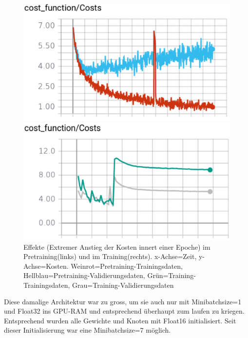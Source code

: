 \begin{figure}
	\centering
	\begin{minipage}[b]{0.48\textwidth}	
		\includegraphics[width=\textwidth]{Kapitel/40Architektur/Bilder/OverflowInPretraining.pdf}
	\end{minipage}
	\hfill
	\begin{minipage}[b]{0.48\textwidth}		
		\includegraphics[width=\textwidth]{Kapitel/40Architektur/Bilder/OverflowInTraining.pdf}
	\end{minipage}
			\caption{Effekte (Extremer Anstieg der Kosten innert einer Epoche) im Pretraining(links) und im Training(rechts). x-Achse=Zeit, y-Achse=Kosten. Weinrot=Pretraining-Trainingsdaten, Hellblau=Pretraining-Validierungsdaten, Grün=Training-Trainingsdaten, Grau=Training-Validierungsdaten}
	\label{img:Overflow}
\end{figure}



Diese damalige Architektur war zu gross, um sie auch nur mit Minibatchsize=1 und Float32 ins GPU-RAM und entsprechend überhaupt zum laufen zu kriegen. 
Entsprechend wurden alle Gewichte und Knoten mit Float16 initialisiert. 
Seit dieser Initialisierung war eine Minibatchsize=7 möglich.

